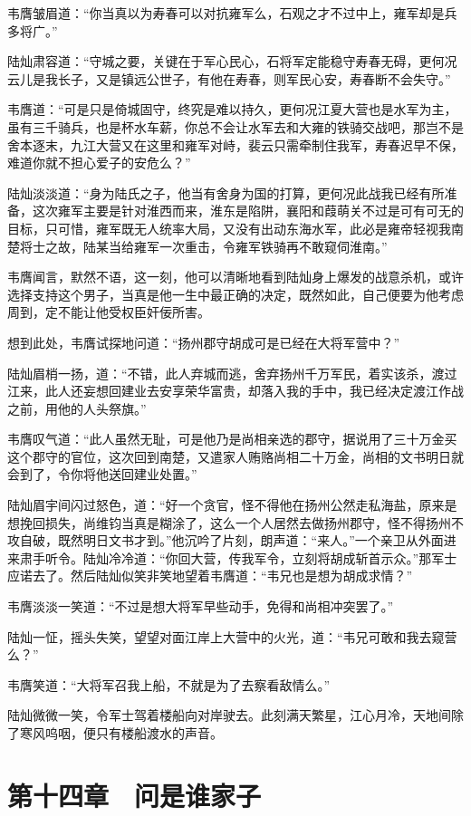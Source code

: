 韦膺皱眉道：“你当真以为寿春可以对抗雍军么，石观之才不过中上，雍军却是兵多将广。”

陆灿肃容道：“守城之要，关键在于军心民心，石将军定能稳守寿春无碍，更何况云儿是我长子，又是镇远公世子，有他在寿春，则军民心安，寿春断不会失守。”

韦膺道：“可是只是倚城固守，终究是难以持久，更何况江夏大营也是水军为主，虽有三千骑兵，也是杯水车薪，你总不会让水军去和大雍的铁骑交战吧，那岂不是舍本逐末，九江大营又在这里和雍军对峙，裴云只需牵制住我军，寿春迟早不保，难道你就不担心爱子的安危么？”

陆灿淡淡道：“身为陆氏之子，他当有舍身为国的打算，更何况此战我已经有所准备，这次雍军主要是针对淮西而来，淮东是陷阱，襄阳和葭萌关不过是可有可无的目标，只可惜，雍军既无人统率大局，又没有出动东海水军，此必是雍帝轻视我南楚将士之故，陆某当给雍军一次重击，令雍军铁骑再不敢窥伺淮南。”

韦膺闻言，默然不语，这一刻，他可以清晰地看到陆灿身上爆发的战意杀机，或许选择支持这个男子，当真是他一生中最正确的决定，既然如此，自己便要为他考虑周到，定不能让他受权臣奸佞所害。

想到此处，韦膺试探地问道：“扬州郡守胡成可是已经在大将军营中？”

陆灿眉梢一扬，道：“不错，此人弃城而逃，舍弃扬州千万军民，着实该杀，渡过江来，此人还妄想回建业去安享荣华富贵，却落入我的手中，我已经决定渡江作战之前，用他的人头祭旗。”

韦膺叹气道：“此人虽然无耻，可是他乃是尚相亲选的郡守，据说用了三十万金买这个郡守的官位，这次回到南楚，又遣家人贿赂尚相二十万金，尚相的文书明日就会到了，令你将他送回建业处置。”

陆灿眉宇间闪过怒色，道：“好一个贪官，怪不得他在扬州公然走私海盐，原来是想挽回损失，尚维钧当真是糊涂了，这么一个人居然去做扬州郡守，怪不得扬州不攻自破，既然明日文书才到。”他沉吟了片刻，朗声道：“来人。”一个亲卫从外面进来肃手听令。陆灿冷冷道：“你回大营，传我军令，立刻将胡成斩首示众。”那军士应诺去了。然后陆灿似笑非笑地望着韦膺道：“韦兄也是想为胡成求情？”

韦膺淡淡一笑道：“不过是想大将军早些动手，免得和尚相冲突罢了。”

陆灿一怔，摇头失笑，望望对面江岸上大营中的火光，道：“韦兄可敢和我去窥营么？”

韦膺笑道：“大将军召我上船，不就是为了去察看敌情么。”

陆灿微微一笑，令军士驾着楼船向对岸驶去。此刻满天繁星，江心月冷，天地间除了寒风呜咽，便只有楼船渡水的声音。

\chapter{第十四章　问是谁家子}

